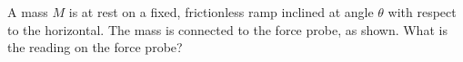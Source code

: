 A mass $M$ is at rest on a fixed, frictionless ramp inclined at angle
$\theta$ with respect to the horizontal. The mass is connected to the
force probe, as shown. What is the reading on the force probe?
